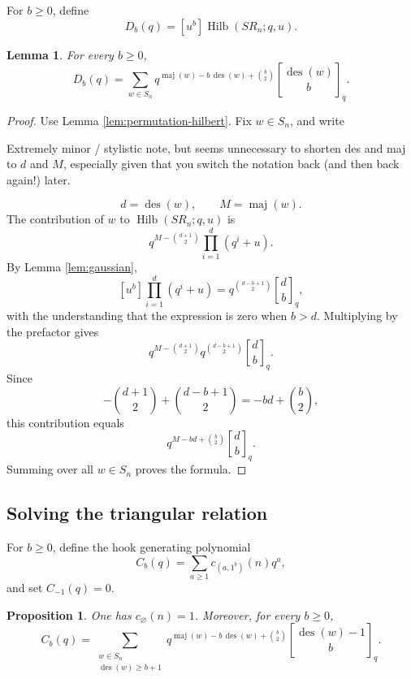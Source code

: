 \documentclass[12pt]{article}
\newtheorem{lemma}[theorem]{Lemma}
\newtheorem{proposition}[theorem]{Proposition}
\DeclareMathOperator{\Hilb}{Hilb}
\DeclareMathOperator{\des}{des}
\DeclareMathOperator{\maj}{maj}
\newcommand{\qbinom}[2]{\genfrac{[}{]}{0pt}{}{#1}{#2}_q}
\newcommand{\review}[1]{\begin{reviewbox}#1\end{reviewbox}}
\begin{document}
For \(b\ge 0\), define
\[
D_b(q)=[u^b]\Hilb(SR_n;q,u).
\]

\begin{lemma}\label{lem:Db}
For every \(b\ge 0\),
\[
D_b(q)
=
\sum_{w\in S_n}
q^{\maj(w)-b\,\des(w)+\binom{b}{2}}
\qbinom{\des(w)}{b}.
\]
\end{lemma}

\begin{proof}
Use Lemma \ref{lem:permutation-hilbert}.  Fix \(w\in S_n\), and write
\review{Extremely minor / stylistic note, but seems unnecessary to shorten des and maj to $d$ and $M$, especially given that you switch the notation back (and then back again!) later. }
\[
d=\des(w),\qquad M=\maj(w).
\]
The contribution of \(w\) to \(\Hilb(SR_n;q,u)\) is
\[
q^{M-\binom{d+1}{2}}\prod_{i=1}^{d}(q^i+u).
\]
By Lemma \ref{lem:gaussian},
\[
[u^b]\prod_{i=1}^{d}(q^i+u)
=
q^{\binom{d-b+1}{2}}\qbinom{d}{b},
\]
with the understanding that the expression is zero when \(b>d\).  Multiplying by the prefactor gives
\[
q^{M-\binom{d+1}{2}}
q^{\binom{d-b+1}{2}}
\qbinom{d}{b}.
\]
Since
\[
-\binom{d+1}{2}+\binom{d-b+1}{2}
=
-bd+\binom{b}{2},
\]
this contribution equals
\[
q^{M-bd+\binom{b}{2}}\qbinom{d}{b}.
\]
Summing over all \(w\in S_n\) proves the formula.
\end{proof}

\subsection{Solving the triangular relation}

For \(b\ge 0\), define the hook generating polynomial
\[
C_b(q)=\sum_{a\ge 1}c_{(a,1^b)}(n)q^a,
\]
and set \(C_{-1}(q)=0\).

\begin{proposition}\label{prop:Cb}
One has \(c_{\varnothing}(n)=1\).  Moreover, for every \(b\ge 0\),
\[
C_b(q)
=
\sum_{\substack{w\in S_n\\ \des(w)\ge b+1}}
q^{\maj(w)-b\,\des(w)+\binom{b}{2}}
\qbinom{\des(w)-1}{b}.
\]
\end{proposition}
\end{document}
